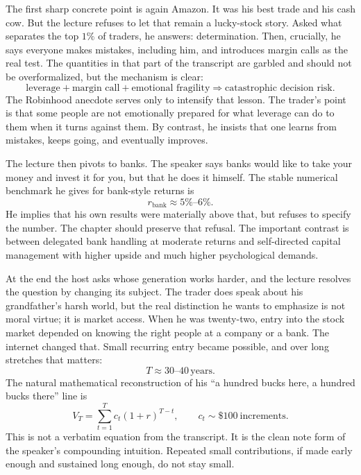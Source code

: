 The first sharp concrete point is again Amazon. It was his best trade and his cash cow. But the lecture refuses to let that remain a lucky-stock story. Asked what separates the top \(1\%\) of traders, he answers: determination. Then, crucially, he says everyone makes mistakes, including him, and introduces margin calls as the real test. The quantities in that part of the transcript are garbled and should not be overformalized, but the mechanism is clear:
\begin{equation}
\text{leverage} + \text{margin call} + \text{emotional fragility}
\Rightarrow
\text{catastrophic decision risk}.
\end{equation}
The Robinhood anecdote serves only to intensify that lesson. The trader's point is that some people are not emotionally prepared for what leverage can do to them when it turns against them. By contrast, he insists that one learns from mistakes, keeps going, and eventually improves.

The lecture then pivots to banks. The speaker says banks would like to take your money and invest it for you, but that he does it himself. The stable numerical benchmark he gives for bank-style returns is
\begin{equation}
r_{\text{bank}} \approx 5\%\text{--}6\%.
\end{equation}
He implies that his own results were materially above that, but refuses to specify the number. The chapter should preserve that refusal. The important contrast is between delegated bank handling at moderate returns and self-directed capital management with higher upside and much higher psychological demands.

At the end the host asks whose generation works harder, and the lecture resolves the question by changing its subject. The trader does speak about his grandfather's harsh world, but the real distinction he wants to emphasize is not moral virtue; it is market access. When he was twenty-two, entry into the stock market depended on knowing the right people at a company or a bank. The internet changed that. Small recurring entry became possible, and over long stretches that matters:
\begin{equation}
T \approx 30\text{--}40\,\text{years}.
\end{equation}
The natural mathematical reconstruction of his ``a hundred bucks here, a hundred bucks there'' line is
\begin{equation}
V_T = \sum_{t=1}^{T} c_t(1+r)^{T-t},
\qquad
c_t \sim \$100\ \text{increments}.
\end{equation}
This is not a verbatim equation from the transcript. It is the clean note form of the speaker's compounding intuition. Repeated small contributions, if made early enough and sustained long enough, do not stay small.

